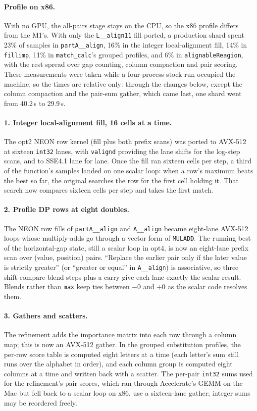 \documentclass[11pt]{article}
\newcommand{\code}[1]{\texttt{#1}}
\begin{document}
\paragraph{Profile on x86.} With no GPU, the all-pairs stage stays on the CPU, so the x86
profile differs from the M1's. With only the \code{L\_\_align11} fill ported, a production
shard spent 23\% of samples in \code{partA\_\_align}, 16\% in the integer local-alignment
fill, 14\% in \code{fillimp}, 11\% in \code{match\_calc}'s grouped profiles, and 6\% in
\code{alignableReagion}, with the rest spread over gap counting, column compaction and pair
scoring. These measurements were taken while a four-process stock run occupied the machine,
so the times are relative only: through the changes below, except the column compaction
and the pair-sum gather, which came last, one shard went from 40.2\,s to 29.9\,s.

\paragraph{1. Integer local-alignment fill, 16 cells at a time.} The opt2 NEON row kernel
(fill plus both prefix scans) was ported to AVX-512 at sixteen \code{int32} lanes, with
\code{valignd} providing the lane shifts for the log-step scans, and to SSE4.1 lane for lane.
Once the fill ran sixteen cells per step, a third of the function's samples landed on one
scalar loop: when a row's maximum beats the best so far, the original searches the row for
the first cell holding it. That search now compares sixteen cells per step and takes the
first match.

\paragraph{2. Profile DP rows at eight doubles.} The NEON row fills of \code{partA\_\_align}
and \code{A\_\_align} became eight-lane AVX-512 loops whose multiply-adds go through a vector
form of \code{MULADD}. The running best of the horizontal-gap state, still a scalar loop in
opt4, is now an eight-lane prefix scan over (value, position) pairs. ``Replace the earlier
pair only if the later value is strictly greater'' (or ``greater or equal'' in
\code{A\_\_align}) is associative, so three shift-compare-blend steps plus a carry give each
lane exactly the scalar result. Blends rather than \code{max} keep ties between $-0$ and $+0$
as the scalar code resolves them.

\paragraph{3. Gathers and scatters.} The refinement adds the importance matrix into each row
through a column map; this is now an AVX-512 gather. In the grouped substitution profiles,
the per-row score table is computed eight letters at a time (each letter's sum still runs
over the alphabet in order), and each column group is computed eight columns at a time and
written back with a scatter. The per-pair \code{int32} sums used for the refinement's pair
scores, which ran through Accelerate's GEMM on the Mac but fell back to a scalar loop on x86,
use a sixteen-lane gather; integer sums may be reordered freely.
\end{document}
